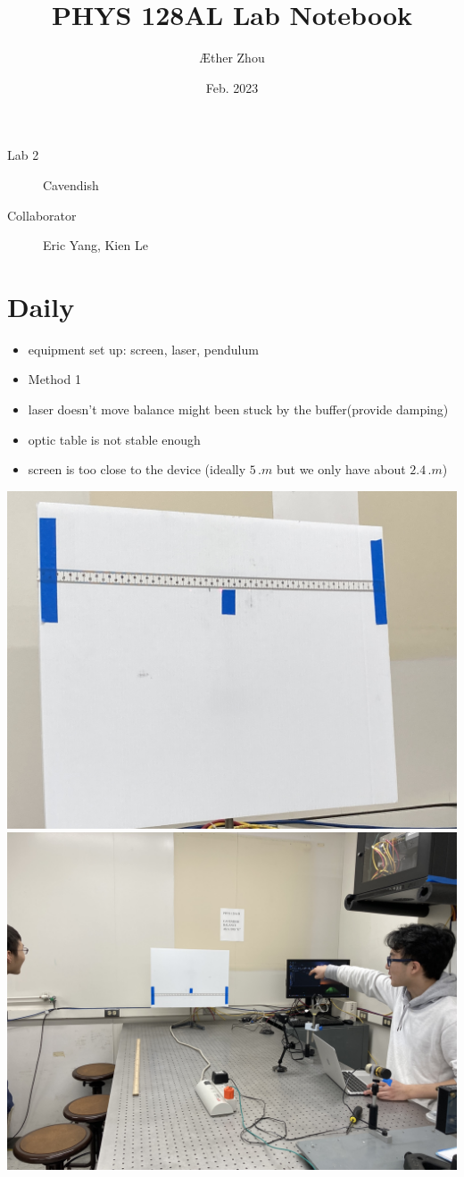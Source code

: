\documentclass[a4paper]{tufte-handout}
\title{PHYS 128AL Lab Notebook}
\author[]{\AE ther Zhou}
\date{Feb. 2023}
\begin{document}
\maketitle

\begin{projects}
	\begin{description}
        \item [Lab 2] Cavendish 
		\item [Collaborator] Eric Yang, Kien Le
		\end{description}
\end{projects}

\tableofcontents

\newpage

\section{Daily}
\begin{itemize}
    \item {equipment set up: } {screen, laser, pendulum}
    \item Method 1
    \item {laser doesn't move} {balance might been stuck by the buffer(provide damping)}
    \item {optic table is not stable enough}
    \item {screen is too close to the device} {(ideally $5\, \si{.m}$ but we only have about $2.4\, \si{.m}$)}
\end{itemize}
\includegraphics[width = 0.5 \textwidth]{figures/day_1_screen.JPG}
\includegraphics[width = 0.5 \textwidth]{figures/day_1.JPG}
\end{document}
